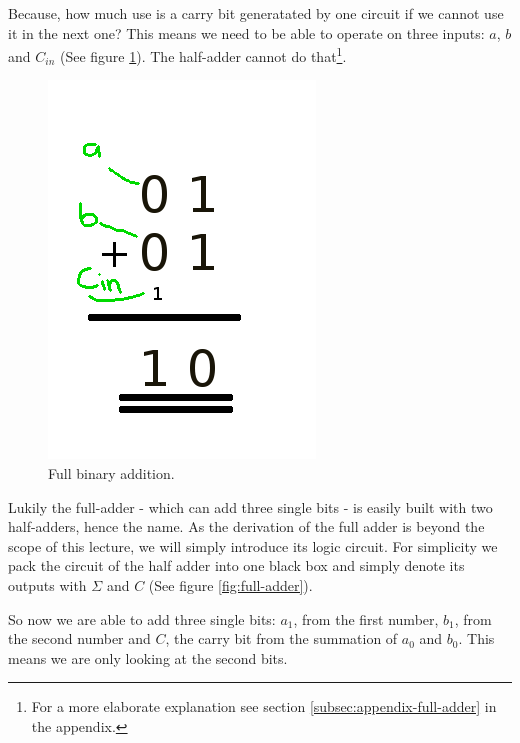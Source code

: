 \documentclass[10pt,a4paper]{article}
\begin{document}
Because, how much use is a carry bit generatated by one circuit if we cannot use it in the next one? This means we need to be able to operate on three inputs: $a$, $b$ and $C_{in}$ (See figure \ref{fig:full-binary-addition}). The half-adder cannot do that\footnote{For a more elaborate explanation see section \ref{subsec:appendix-full-adder} in the appendix.}.

\begin{figure}[H]
	\centering		  
	\includegraphics[scale=0.3]{full_binary_addition.png}
	\caption{Full binary addition.}
	\label{fig:full-binary-addition}
\end{figure}






Lukily the full-adder - which can add three single bits - is easily built with two half-adders, hence the name. As the derivation of the full adder is beyond the scope of this lecture, we will simply introduce its logic circuit. For simplicity we pack the circuit of the half adder into one black box and simply denote its outputs with $\Sigma$ and $C$ (See figure \ref{fig:full-adder}).

So now we are able to add three single bits: $a_1$, from the first number, $b_1$, from the second number and $C$, the carry bit from the summation of $a_0$ and $b_0$. This means we are only looking at the second bits.
\end{document}
